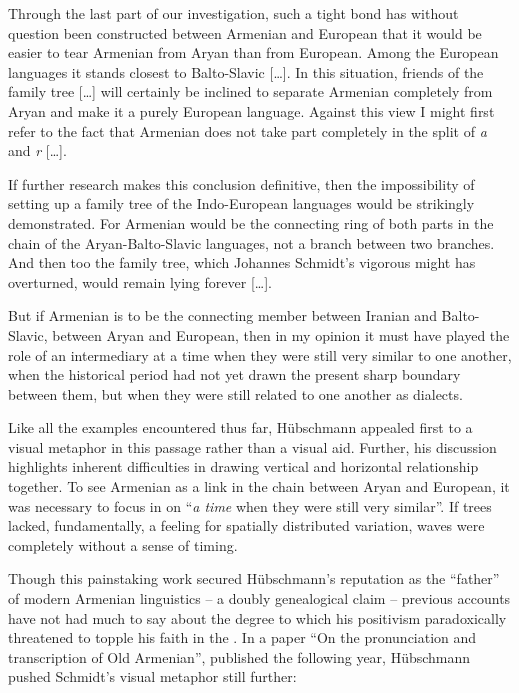 \documentclass[output=paper]{langscibook}
\begin{document}
\begin{modquote}
Through the last part of our investigation, such a tight bond has without question been constructed between Armenian and European that it would be easier to tear Armenian from Aryan than from European. Among the European languages it stands closest to Balto-Slavic […]. In this situation, friends of the family tree […] will certainly be inclined to separate Armenian completely from Aryan and make it a purely European language. Against this view I might first refer to the fact that Armenian does not take part completely in the split of \emph{a} and \emph{r} […].

If further research makes this conclusion definitive, then the impossibility of setting up a family tree of the Indo-European languages would be strikingly demonstrated. For Armenian would be the connecting ring of both parts in the chain of the Aryan-Balto-Slavic languages, not a branch between two branches. And then too the family tree, which Johannes Schmidt's vigorous might has overturned, would remain lying forever […].

But if Armenian is to be the connecting member between Iranian and Balto-Slavic, between Aryan and European, then in my opinion it must have played the role of an intermediary at a time when they were still very similar to one another, when the historical period had not yet drawn the present sharp boundary between them, but when they were still related to one another as dialects. \citep[183]{Huebschmann1875}
\end{modquote}

Like all the examples encountered thus far, Hübschmann appealed first to a visual metaphor in this passage rather than a visual aid. Further, his discussion highlights inherent difficulties in drawing vertical and horizontal relationship together. To see Armenian as a link in the chain between Aryan and European, it was necessary to focus in on ``\emph{a time} when they were still very similar''. If trees lacked, fundamentally, a feeling for spatially distributed variation, waves were completely without a sense of timing.

Though this painstaking work secured Hübschmann's reputation as the ``father'' of modern Armenian linguistics -- a doubly genealogical claim -- previous accounts have not had much to say about the degree to which his positivism paradoxically threatened to topple his faith in the . In a paper ``On the pronunciation and transcription of Old Armenian'', published the following year, Hübschmann pushed Schmidt's visual metaphor still further:
\end{document}
